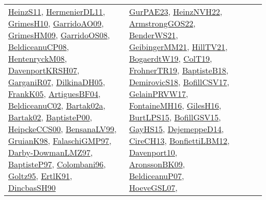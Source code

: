 {\begin{longtable}{lp{3cm}>{\raggedright}p{6cm}>{\raggedright}p{6cm}p{8cm}}
\href{papers/HeinzS11.pdf}{HeinzS11}\cite{HeinzS11}, \href{papers/HermenierDL11.pdf}{HermenierDL11}\cite{HermenierDL11}, \href{papers/GrimesH10.pdf}{GrimesH10}\cite{GrimesH10}, \href{articles/GarridoAO09.pdf}{GarridoAO09}\cite{GarridoAO09}, \href{papers/GrimesHM09.pdf}{GrimesHM09}\cite{GrimesHM09}, \href{articles/GarridoOS08.pdf}{GarridoOS08}\cite{GarridoOS08}, \href{papers/BeldiceanuCP08.pdf}{BeldiceanuCP08}\cite{BeldiceanuCP08}, \href{papers/HentenryckM08.pdf}{HentenryckM08}\cite{HentenryckM08}, \href{papers/DavenportKRSH07.pdf}{DavenportKRSH07}\cite{DavenportKRSH07}, \href{papers/GarganiR07.pdf}{GarganiR07}\cite{GarganiR07}, \href{papers/DilkinaDH05.pdf}{DilkinaDH05}\cite{DilkinaDH05}, \href{papers/FrankK05.pdf}{FrankK05}\cite{FrankK05}, \href{papers/ArtiguesBF04.pdf}{ArtiguesBF04}\cite{ArtiguesBF04}, \href{papers/BeldiceanuC02.pdf}{BeldiceanuC02}\cite{BeldiceanuC02}, \href{papers/Bartak02a.pdf}{Bartak02a}\cite{Bartak02a}, \href{papers/Bartak02.pdf}{Bartak02}\cite{Bartak02}, \href{articles/BaptisteP00.pdf}{BaptisteP00}\cite{BaptisteP00}, \href{articles/HeipckeCCS00.pdf}{HeipckeCCS00}\cite{HeipckeCCS00}, \href{articles/BensanaLV99.pdf}{BensanaLV99}\cite{BensanaLV99}, \href{papers/GruianK98.pdf}{GruianK98}\cite{GruianK98}, \href{articles/FalaschiGMP97.pdf}{FalaschiGMP97}\cite{FalaschiGMP97}, \href{articles/Darby-DowmanLMZ97.pdf}{Darby-DowmanLMZ97}\cite{Darby-DowmanLMZ97}, \href{papers/BaptisteP97.pdf}{BaptisteP97}\cite{BaptisteP97}, \href{papers/Colombani96.pdf}{Colombani96}\cite{Colombani96}, \href{papers/Goltz95.pdf}{Goltz95}\cite{Goltz95}, \href{papers/ErtlK91.pdf}{ErtlK91}\cite{ErtlK91}, \href{articles/DincbasSH90.pdf}{DincbasSH90}\cite{DincbasSH90} & \href{articles/GurPAE23.pdf}{GurPAE23}\cite{GurPAE23}, \href{articles/HeinzNVH22.pdf}{HeinzNVH22}\cite{HeinzNVH22}, \href{papers/ArmstrongGOS22.pdf}{ArmstrongGOS22}\cite{ArmstrongGOS22}, \href{papers/BenderWS21.pdf}{BenderWS21}\cite{BenderWS21}, \href{papers/GeibingerMM21.pdf}{GeibingerMM21}\cite{GeibingerMM21}, \href{papers/HillTV21.pdf}{HillTV21}\cite{HillTV21}, \href{papers/BogaerdtW19.pdf}{BogaerdtW19}\cite{BogaerdtW19}, \href{papers/ColT19.pdf}{ColT19}\cite{ColT19}, \href{papers/FrohnerTR19.pdf}{FrohnerTR19}\cite{FrohnerTR19}, \href{articles/BaptisteB18.pdf}{BaptisteB18}\cite{BaptisteB18}, \href{papers/DemirovicS18.pdf}{DemirovicS18}\cite{DemirovicS18}, \href{papers/BofillCSV17.pdf}{BofillCSV17}\cite{BofillCSV17}, \href{papers/GelainPRVW17.pdf}{GelainPRVW17}\cite{GelainPRVW17}, \href{papers/FontaineMH16.pdf}{FontaineMH16}\cite{FontaineMH16}, \href{papers/GilesH16.pdf}{GilesH16}\cite{GilesH16}, \href{papers/BurtLPS15.pdf}{BurtLPS15}\cite{BurtLPS15}, \href{papers/BofillGSV15.pdf}{BofillGSV15}\cite{BofillGSV15}, \href{papers/GayHS15.pdf}{GayHS15}\cite{GayHS15}, \href{papers/DejemeppeD14.pdf}{DejemeppeD14}\cite{DejemeppeD14}, \href{papers/CireCH13.pdf}{CireCH13}\cite{CireCH13}, \href{papers/BonfiettiLBM12.pdf}{BonfiettiLBM12}\cite{BonfiettiLBM12}, \href{papers/Davenport10.pdf}{Davenport10}\cite{Davenport10}, \href{papers/AronssonBK09.pdf}{AronssonBK09}\cite{AronssonBK09}, \href{papers/BeldiceanuP07.pdf}{BeldiceanuP07}\cite{BeldiceanuP07}, \href{papers/HoeveGSL07.pdf}{HoeveGSL07}\cite{HoeveGSL07}, 
\end{longtable}}
